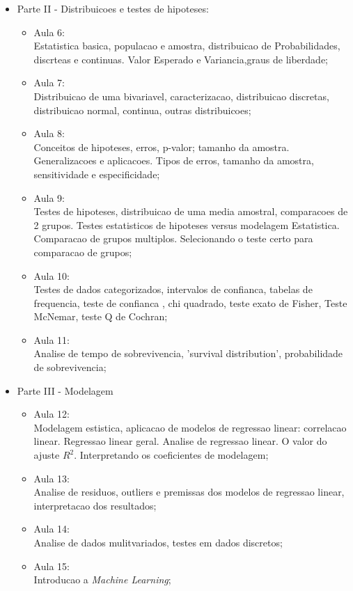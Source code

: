 \documentclass[oneside,a4paper,12pt]{article}
\begin{document}
\begin{itemize}
\begin{itemize}
		\end{itemize}
		\item Parte II - Distribuicoes e testes de hipoteses:
		\begin{itemize}
		    \item Aula 6:\\
		    Estatistica basica, populacao e amostra, distribuicao de Probabilidades, discrteas e continuas. Valor Esperado e Variancia,graus de liberdade;
		    \item Aula 7:\\
		    Distribuicao de uma bivariavel, caracterizacao, distribuicao discretas, distribuicao normal, continua, outras distribuicoes;
		    \item Aula 8:\\
		    Conceitos de hipoteses, erros, p-valor; tamanho da amostra. Generalizacoes e aplicacoes. Tipos de erros, tamanho da amostra, sensitividade e especificidade;
		    \item Aula 9:\\
		    Testes de hipoteses, distribuicao de uma media amostral, comparacoes de 2 grupos. Testes estatisticos de hipoteses versus modelagem Estatistica. Comparacao de grupos multiplos. Selecionando o teste certo para comparacao de grupos;
		    \item Aula 10: \\
		    Testes de dados categorizados, intervalos de confianca, tabelas de frequencia, teste de confianca  , chi quadrado, teste  exato de Fisher, Teste McNemar, teste Q de Cochran;
		    
		    	\item Aula 11:\\
		    Analise de tempo de sobrevivencia, 'survival distribution', probabilidade de sobrevivencia;
		    
		\end{itemize}{}
		
		 \item Parte III - Modelagem
		\begin{itemize}
		   
	         \item Aula 12:\\
	         Modelagem estistica, aplicacao de modelos de regressao linear: correlacao linear. Regressao linear geral. Analise de regressao linear. O valor do ajuste $R^{2}$. Interpretando os coeficientes de modelagem;
	         
			\item Aula 13:\\
			Analise de residuos, outliers e premissas dos modelos de regressao linear, interpretacao dos resultados;
			
			\item Aula 14:\\
			Analise de dados mulitvariados, testes em dados discretos;
			\item Aula 15:\\
			Introducao a \textit{Machine Learning};
		
		\end{itemize}
		
	\end{itemize}
	
\end{document}
